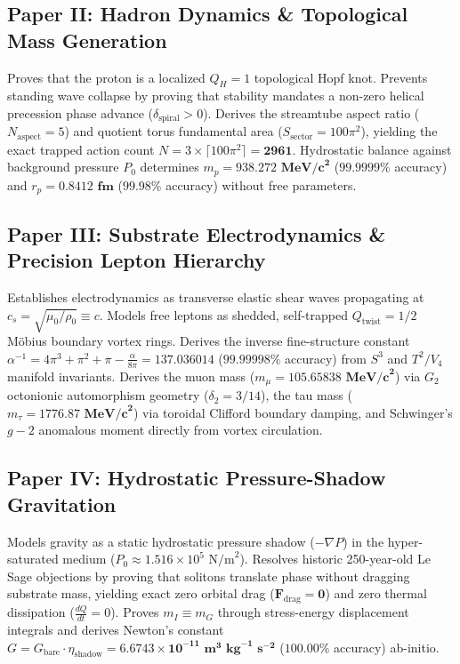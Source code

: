 \documentclass[11pt,a4paper]{article}
\begin{document}
	\subsection{Paper II: Hadron Dynamics \& Topological Mass Generation}
	Proves that the proton is a localized $Q_H = 1$ topological Hopf knot. Prevents standing wave collapse by proving that stability mandates a non-zero helical precession phase advance ($\delta_{\text{spiral}} > 0$). Derives the streamtube aspect ratio ($N_{\text{aspect}} = 5$) and quotient torus fundamental area ($S_{\text{sector}} = 100\pi^2$), yielding the exact trapped action count $N = 3 \times \lceil 100\pi^2 \rceil = \mathbf{2961}$. Hydrostatic balance against background pressure $P_0$ determines $m_p = \mathbf{938.272 \text{ MeV/c}^2}$ ($99.9999\%$ accuracy) and $r_p = \mathbf{0.8412 \text{ fm}}$ ($99.98\%$ accuracy) without free parameters.
	
	\subsection{Paper III: Substrate Electrodynamics \& Precision Lepton Hierarchy}
	Establishes electrodynamics as transverse elastic shear waves propagating at $c_s = \sqrt{\mu_0/\rho_0} \equiv c$. Models free leptons as shedded, self-trapped $Q_{\text{twist}} = 1/2$ Möbius boundary vortex rings. Derives the inverse fine-structure constant $\alpha^{-1} = 4\pi^3 + \pi^2 + \pi - \frac{\alpha}{8\pi} = \mathbf{137.036014}$ ($99.99998\%$ accuracy) from $S^3$ and $T^2/V_4$ manifold invariants. Derives the muon mass ($m_\mu = \mathbf{105.65838 \text{ MeV/c}^2}$) via $G_2$ octonionic automorphism geometry ($\delta_2 = 3/14$), the tau mass ($m_\tau = \mathbf{1776.87 \text{ MeV/c}^2}$) via toroidal Clifford boundary damping, and Schwinger's $g-2$ anomalous moment directly from vortex circulation.
	
	\subsection{Paper IV: Hydrostatic Pressure-Shadow Gravitation}
	Models gravity as a static hydrostatic pressure shadow ($-\nabla P$) in the hyper-saturated medium ($P_0 \approx 1.516 \times 10^5 \text{ N/m}^2$). Resolves historic 250-year-old Le Sage objections by proving that solitons translate phase without dragging substrate mass, yielding exact zero orbital drag ($\mathbf{F}_{\text{drag}} = \mathbf{0}$) and zero thermal dissipation ($\frac{dQ}{dt} = 0$). Proves $m_I \equiv m_G$ through stress-energy displacement integrals and derives Newton's constant $G = G_{\text{bare}} \cdot \eta_{\text{shadow}} = \mathbf{6.6743 \times 10^{-11} \text{ m}^3\text{ kg}^{-1}\text{ s}^{-2}}$ ($100.00\%$ accuracy) ab-initio.
	
\end{document}
